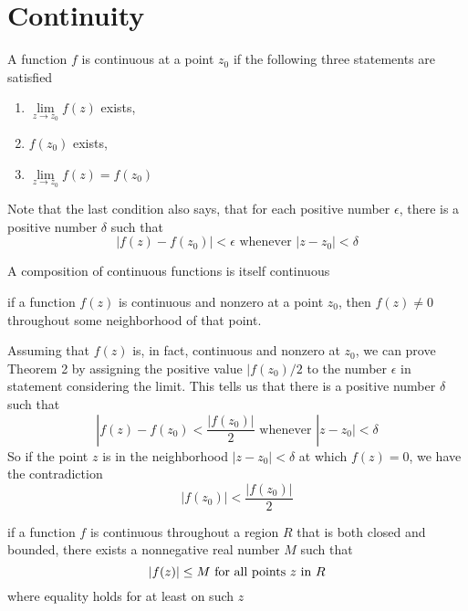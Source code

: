 \section{Continuity}
A function $ f $ is continuous at a point $ z_0 $ if the following three statements are satisfied 
\begin{enumerate}
	\item $ \lim\limits_{z \rightarrow z_0} f(z) $ exists, 
	\item $ f(z_0) $ exists, 
	\item $ \lim\limits_{z \rightarrow z_0} f(z) = f(z_0) $
\end{enumerate}
Note that the last condition also says, that for each positive number $ \epsilon $, there is a positive number $ \delta $ such that \[ |f(z)-f(z_0)| < \epsilon \text{ whenever } |z-z_0|<\delta\]
\begin{theorem}
	A composition of continuous functions is itself continuous
\end{theorem}
\begin{theorem}
	if a function $ f(z) $ is continuous and nonzero at a point $ z_0 $, then $ f(z) \neq 0 $ throughout some neighborhood of that point. 
\end{theorem}
Assuming that $ f(z) $ is, in fact, continuous and nonzero at $ z_0 $, we can prove Theorem 2 by assigning the positive value $ |f(z_0)/2 $ to the number $ \epsilon $ in statement considering the limit. This tells us that there is a positive number $ \delta $ such that 
\[ |f(z)-f(z_0) < \dfrac{|f(z_0)|}{2} \text{ whenever } |z-z_0| < \delta\] 
So if the point $ z $ is in the neighborhood $ |z-z_0| < \delta $ at which $ f(z) = 0 $, we have the contradiction \[ |f(z_0)| < \dfrac{|f(z_0)|}{2} \]
\begin{theorem}
	if a function $ f $ is continuous throughout a region $ R $ that is both closed and bounded, there exists a nonnegative real number $ M $ such that \[ |f(z)| \leq M \text{ for all points $ z $ in $ R $} \]
	where equality holds for at least on such $ z $
\end{theorem}

